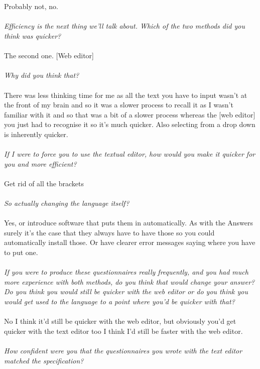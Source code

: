 \documentclass{report}
\begin{document}
\\
\\
Probably not, no.
\\
\\
\textit{Efficiency is the next thing we'll talk about. Which of the two methods did you think was quicker?}
\\
\\
The second one. [Web editor] 
\\
\\
\textit{Why did you think that?}
\\
\\
There was less thinking time for me as all the text you have to input wasn't at the front of my brain and so it was a slower process to recall it as I wasn't familiar with it and so that was a bit of a slower process whereas the [web editor] you just had to recognise it so it's much quicker. Also selecting from a drop down is inherently quicker.
\\
\\
\textit{If I were to force you to use the textual editor, how would you make it quicker for you and more efficient?}
\\
\\
Get rid of all the brackets
\\
\\
\textit{So actually changing the language itself?}
\\
\\
Yes, or introduce software that puts them in automatically. As with the Answers surely it's the case that they always have to have those so you could automatically install those. Or have clearer error messages saying where you have to put one.
\\
\\
\textit{If you were to produce these questionnaires really frequently, and you had much more experience with both methods, do you think that would change your answer? Do you think you would still be quicker with the web editor or do you think you would get used to the language to a point where you'd be quicker with that?}
\\
\\
No I think it'd still be quicker with the web editor, but obviously you'd get quicker with the text editor too I think I'd still be faster with the web editor.
\\
\\
\textit{How confident were you that the questionnaires you wrote with the text editor matched the specification?}
\end{document}
